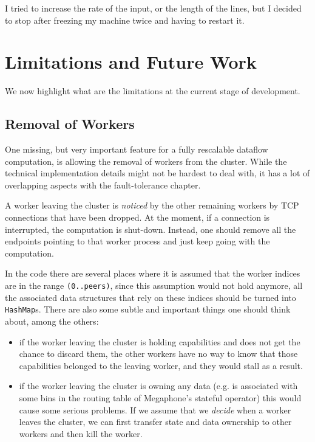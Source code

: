 \documentclass[12pt]{extarticle}
\begin{document}
I tried to increase the rate of the input, or the length of the lines, but I decided to stop after freezing my machine twice and having to restart it.

\section{Limitations and Future Work}

We now highlight what are the limitations at the current stage of development.

\subsection{Removal of Workers}
One missing, but very important feature for a fully rescalable dataflow computation, is allowing the removal of workers from
the cluster. While the technical implementation details might not be hardest to deal with, it has a lot of
overlapping aspects with the fault-tolerance chapter.

A worker leaving the cluster is \textit{noticed} by the other remaining workers by TCP connections that have been dropped.
At the moment, if a connection is interrupted, the computation is shut-down. Instead, one should remove
all the endpoints pointing to that worker process and just keep going with the computation.

In the code there are several places where it is assumed that the worker indices are in the range \verb|(0..peers)|,
since this assumption would not hold anymore, all the associated data structures that rely on these indices should be turned
into \verb|HashMap|s.
There are also some subtle and important things one should think about, among the others:

\begin{itemize}
    \item if the worker leaving the cluster is holding capabilities and does not get the chance to discard them, the other
        workers have no way to know that those capabilities belonged to the leaving worker, and they would stall as a result.
    \item if the worker leaving the cluster is owning any data (e.g. is associated with some bins in the
        routing table of Megaphone's stateful operator) this would cause some serious problems.
        If we assume that we \textit{decide} when a worker leaves the cluster, we can first transfer state and data ownership to
        other workers and then kill the worker.
\end{itemize}
\end{document}
